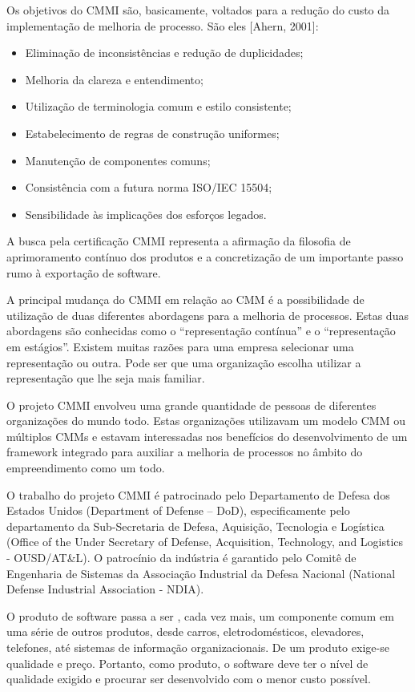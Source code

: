 Os objetivos do CMMI são, basicamente, voltados para a redução do custo da
implementação de melhoria de processo. São eles [Ahern, 2001]:

\begin{itemize}
    \item Eliminação de inconsistências e redução de duplicidades;
    \item  Melhoria da clareza e entendimento;
    \item  Utilização de terminologia comum e estilo consistente;
    \item  Estabelecimento de regras de construção uniformes;
    \item  Manutenção de componentes comuns;
    \item  Consistência com a futura norma ISO/IEC 15504;
    \item  Sensibilidade às implicações dos esforços legados.
\end{itemize}

A busca pela certificação CMMI representa a afirmação da filosofia de
aprimoramento contínuo dos produtos e a concretização de um importante passo rumo à
exportação de software.

A principal mudança do CMMI em relação ao CMM é a possibilidade de utilização
de duas diferentes abordagens para a melhoria de processos. Estas duas abordagens são
conhecidas como o “representação contínua” e o “representação em estágios”. Existem
muitas razões para uma empresa selecionar uma representação ou outra. Pode ser que uma
organização escolha utilizar a representação que lhe seja mais familiar.

O projeto CMMI envolveu uma grande quantidade de pessoas de diferentes
organizações do mundo todo. Estas organizações utilizavam um modelo CMM ou
múltiplos CMMs e estavam interessadas nos benefícios do desenvolvimento de um
framework integrado para auxiliar a melhoria de processos no âmbito do
empreendimento como um todo.

O trabalho do projeto CMMI é patrocinado pelo Departamento de Defesa dos
Estados Unidos (Department of Defense – DoD), especificamente pelo departamento da
Sub-Secretaria de Defesa, Aquisição, Tecnologia e Logística (Office of the Under
Secretary of Defense, Acquisition, Technology, and Logistics - OUSD/AT\&L). O
patrocínio da indústria é garantido pelo Comitê de Engenharia de Sistemas da
Associação Industrial da Defesa Nacional (National Defense Industrial Association -
NDIA).

O produto de software passa a ser , cada vez mais, um componente comum em uma
série de outros produtos, desde carros, eletrodomésticos, elevadores, telefones, até sistemas de informação organizacionais. De um produto exige-se qualidade e preço. Portanto, como produto, o software deve ter o nível de qualidade exigido e procurar ser desenvolvido com o menor custo possível.

